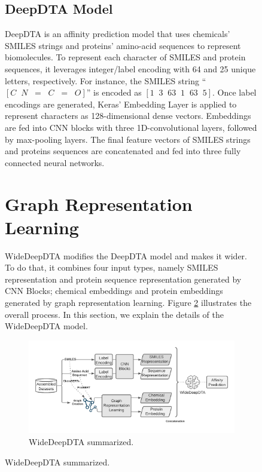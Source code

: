 \begin{figure}[h]
\subsection{DeepDTA Model}
DeepDTA is an affinity prediction model that uses chemicals' SMILES strings and proteins' amino-acid sequences to represent biomolecules. To represent each character of SMILES and protein sequences, it leverages integer/label encoding with 64 and 25 unique letters, respectively. For instance, the SMILES string ``$ [ C \;\; N \;\;=\;\; C\;\; =\;\; O]$'' is encoded as $[ 1 \;\; 3 \;\; 63\;\; 1 \;\;63\;\; 5]$. Once label encodings are generated, Keras' Embedding Layer is applied to represent characters as 128-dimensional dense vectors. Embeddings are fed into CNN blocks with three 1D-convolutional layers, followed by max-pooling layers. The final feature vectors of SMILES strings and proteins sequences are concatenated and fed into three fully connected neural networks.

\section{Graph Representation Learning}
WideDeepDTA modifies the DeepDTA model and makes it wider. To do that, it combines four input types, namely  SMILES representation and protein sequence representation generated by CNN Blocks; chemical embeddings and protein embeddings generated by graph representation learning. Figure \ref{fig:widerdeepdta} illustrates the overall process. In this section, we explain the details of the WideDeepDTA model.
\begin{figure}
    \centering
        \includegraphics[width=\linewidth]{chapters/materials_and_methods/figures/WiderDeep.png}
    \caption{WideDeepDTA summarized.}
    \label{fig:widerdeepdta}
\end{figure}


\end{figure}
